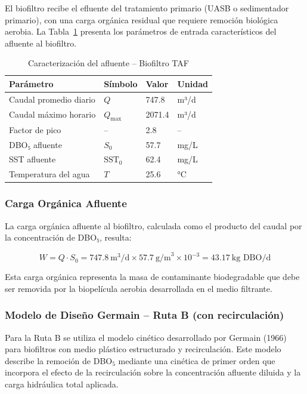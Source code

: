 \documentclass[12pt,a4paper]{article}
\begin{document}
El biofiltro recibe el efluente del tratamiento primario (UASB o sedimentador primario), con una carga orgánica residual que requiere remoción biológica aerobia. La Tabla~\ref{tab:entrada_taf} presenta los parámetros de entrada característicos del afluente al biofiltro.

\begin{table}[H]
\centering
\caption{Caracterización del afluente -- Biofiltro TAF}
\label{tab:entrada_taf}
\begin{tabular}{llll}
\toprule
\textbf{Parámetro} & \textbf{Símbolo} & \textbf{Valor} & \textbf{Unidad} \\
\midrule
Caudal promedio diario & $Q$ & 747.8 & m³/d \\
Caudal máximo horario & $Q_{\text{max}}$ & 2071.4 & m³/d \\
Factor de pico & -- & 2.8 & -- \\
DBO₅ afluente & $S_0$ & 57.7 & mg/L \\
SST afluente & $\text{SST}_0$ & 62.4 & mg/L \\
Temperatura del agua & $T$ & 25.6 & °C \\

\bottomrule
\end{tabular}
\end{table}

\subsubsection*{Carga Orgánica Afluente}

La carga orgánica afluente al biofiltro, calculada como el producto del caudal por la concentración de DBO₅, resulta:

\begin{equation}
W = Q \cdot S_0 = 747.8\ \text{m}^3\text{/d} \times 57.7\ \text{g/m}^3 \times 10^{-3} = 43.17\ \text{kg DBO/d}
\end{equation}

Esta carga orgánica representa la masa de contaminante biodegradable que debe ser removida por la biopelícula aerobia desarrollada en el medio filtrante.

\subsubsection*{Modelo de Diseño Germain -- Ruta B (con recirculación)}

Para la Ruta B se utiliza el modelo cinético desarrollado por Germain (1966) para biofiltros con medio plástico estructurado y recirculación. Este modelo describe la remoción de DBO$_5$ mediante una cinética de primer orden que incorpora el efecto de la recirculación sobre la concentración afluente diluida y la carga hidráulica total aplicada.
\end{document}
